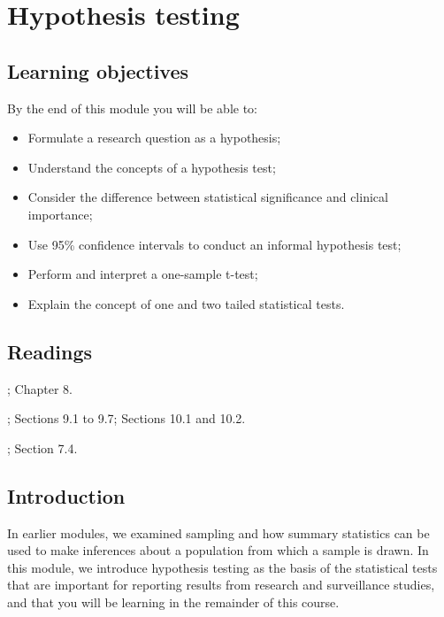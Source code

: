 \documentclass[
]{memoir}
\providecommand{\tightlist}{%
  \setlength{\itemsep}{0pt}\setlength{\parskip}{0pt}}
\begin{document}
\hypertarget{hypothesis-testing}{%
\chapter{Hypothesis testing}\label{hypothesis-testing}}

\hypertarget{learning-objectives-3}{%
\section*{Learning objectives}\label{learning-objectives-3}}

By the end of this module you will be able to:

\begin{itemize}
\tightlist
\item
  Formulate a research question as a hypothesis;
\item
  Understand the concepts of a hypothesis test;
\item
  Consider the difference between statistical significance and clinical importance;
\item
  Use 95\% confidence intervals to conduct an informal hypothesis test;
\item
  Perform and interpret a one-sample t-test;
\item
  Explain the concept of one and two tailed statistical tests.
\end{itemize}

\hypertarget{readings-3}{%
\section*{Readings}\label{readings-3}}

\citet{kirkwood_sterne01}; Chapter 8.

\citet{bland15}; Sections 9.1 to 9.7; Sections 10.1 and 10.2.

\citet{acock10}; Section 7.4.

\hypertarget{introduction-2}{%
\section{Introduction}\label{introduction-2}}

In earlier modules, we examined sampling and how summary statistics can be used to make inferences about a population from which a sample is drawn. In this module, we introduce hypothesis testing as the basis of the statistical tests that are important for reporting results from research and surveillance studies, and that you will be learning in the remainder of this course.
\end{document}
